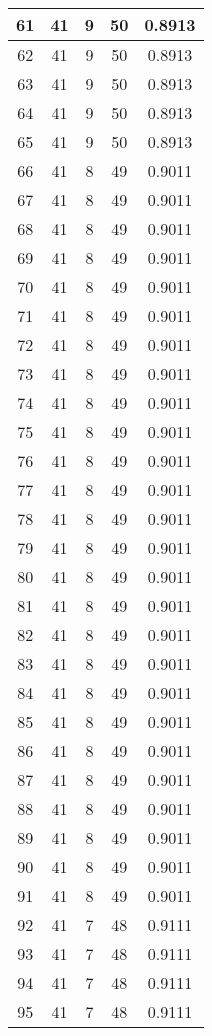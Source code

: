 \documentclass[letterpaper, 12pt]{article}
\begin{document}
\begin{longtable}{|c|c|c|c|c|}
\hline
61 & 41 & 9 & 50 & 0.8913 \\
\hline
62 & 41 & 9 & 50 & 0.8913 \\
\hline
63 & 41 & 9 & 50 & 0.8913 \\
\hline
64 & 41 & 9 & 50 & 0.8913 \\
\hline
65 & 41 & 9 & 50 & 0.8913 \\
\hline
66 & 41 & 8 & 49 & 0.9011 \\
\hline
67 & 41 & 8 & 49 & 0.9011 \\
\hline
68 & 41 & 8 & 49 & 0.9011 \\
\hline
69 & 41 & 8 & 49 & 0.9011 \\
\hline
70 & 41 & 8 & 49 & 0.9011 \\
\hline
71 & 41 & 8 & 49 & 0.9011 \\
\hline
72 & 41 & 8 & 49 & 0.9011 \\
\hline
73 & 41 & 8 & 49 & 0.9011 \\
\hline
74 & 41 & 8 & 49 & 0.9011 \\
\hline
75 & 41 & 8 & 49 & 0.9011 \\
\hline
76 & 41 & 8 & 49 & 0.9011 \\
\hline
77 & 41 & 8 & 49 & 0.9011 \\
\hline
78 & 41 & 8 & 49 & 0.9011 \\
\hline
79 & 41 & 8 & 49 & 0.9011 \\
\hline
80 & 41 & 8 & 49 & 0.9011 \\
\hline
81 & 41 & 8 & 49 & 0.9011 \\
\hline
82 & 41 & 8 & 49 & 0.9011 \\
\hline
83 & 41 & 8 & 49 & 0.9011 \\
\hline
84 & 41 & 8 & 49 & 0.9011 \\
\hline
85 & 41 & 8 & 49 & 0.9011 \\
\hline
86 & 41 & 8 & 49 & 0.9011 \\
\hline
87 & 41 & 8 & 49 & 0.9011 \\
\hline
88 & 41 & 8 & 49 & 0.9011 \\
\hline
89 & 41 & 8 & 49 & 0.9011 \\
\hline
90 & 41 & 8 & 49 & 0.9011 \\
\hline
91 & 41 & 8 & 49 & 0.9011 \\
\hline
92 & 41 & 7 & 48 & 0.9111 \\
\hline
93 & 41 & 7 & 48 & 0.9111 \\
\hline
94 & 41 & 7 & 48 & 0.9111 \\
\hline
95 & 41 & 7 & 48 & 0.9111 \\

\end{longtable}
\end{document}
